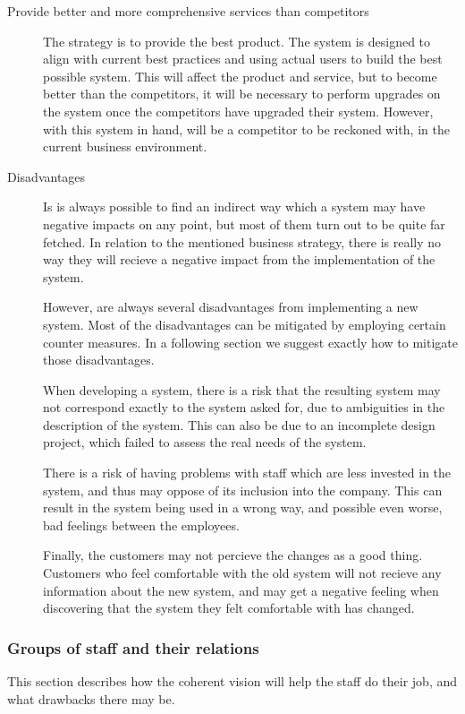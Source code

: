 \begin{description}
\item[Provide better and more comprehensive services than competitors]
The strategy is to provide the best product. The system is designed to align
with current best practices and using actual users to build the best possible
system. This will affect the product and service, but to become better than
the competitors, it will be necessary to perform upgrades on the system once
the competitors have upgraded their system. However, with this system in hand,
\gomonkey will be a competitor to be reckoned with, in the current business 
environment.

\item[Disadvantages]
Is is always possible to find an indirect way which a system may have negative
impacts on any point, but most of them turn out to be quite far fetched. In
relation to the mentioned business strategy, there is really no way they will
recieve a negative impact from the implementation of the system.

However, are always several disadvantages from implementing a new system. Most 
of the disadvantages can be mitigated by employing certain counter measures.
In a following section we suggest exactly how to mitigate those disadvantages.
 
When developing a system, there is a risk that the resulting system may not 
correspond exactly to the system asked for, due to ambiguities in the 
description of the system. This can also be due to an incomplete design project,
which failed to assess the real needs of the system.

There is a risk of having problems with staff which are less invested in the
system, and thus may oppose of its inclusion into the company. This can result
in the system being used in a wrong way, and possible even worse, bad feelings 
between the employees. 

Finally, the customers may not percieve the changes as a good thing. Customers
who feel comfortable with the old system will not recieve any information about
the new system, and may get a negative feeling when discovering that the system
they felt comfortable with has changed.
\end{description}

\subsubsection{Groups of staff and their relations}
This section describes how the coherent vision will help the staff do their 
job, and what drawbacks there may be. 

